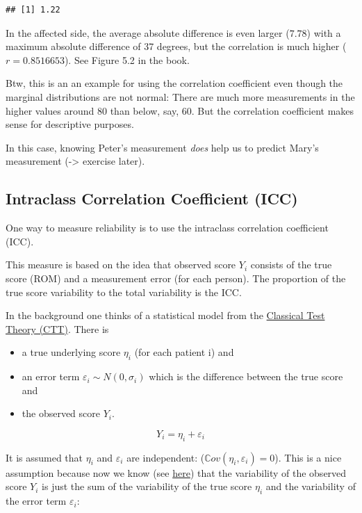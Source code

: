 \documentclass[
]{book}
\providecommand{\tightlist}{%
  \setlength{\itemsep}{0pt}\setlength{\parskip}{0pt}}
\begin{document}
\begin{verbatim}
## [1] 1.22
\end{verbatim}

In the affected side, the average absolute difference is even larger (\(7.78\))
with a maximum absolute difference of 37 degrees,
but the correlation is much higher (\(r=0.8516653\)). See Figure 5.2 in the book.

Btw, this is an an example for using the correlation coefficient even though
the marginal distributions are not normal: There are much more measurements in the higher
values around 80 than below, say, 60. But the correlation coefficient makes sense
for descriptive purposes.

In this case, knowing Peter's measurement \emph{does} help us to predict
Mary's measurement (-\textgreater{} exercise later).

\subsection{Intraclass Correlation Coefficient (ICC)}\label{intraclass-correlation-coefficient-icc}

One way to measure reliability is to use the intraclass correlation coefficient (ICC).

This measure is based on the idea that observed score \(Y_i\) consists of the true score
(ROM) and a measurement error (for each person).
The proportion of the true score variability to the total variability is the ICC.

In the background one thinks of a statistical model from the
\href{https://en.wikipedia.org/wiki/Classical_test_theory}{Classical Test Theory (CTT)}.
There is

\begin{itemize}
\tightlist
\item
  a true underlying score \(\eta_i\) (for each patient i) and
\item
  an error term \(\varepsilon_i \sim N(0, \sigma_i)\) which is the difference between the true
  score and
\item
  the observed score \(Y_i\).
\end{itemize}

\[ Y_i = \eta_i + \varepsilon_i \]

It is assumed that \(\eta_i\) and \(\varepsilon_i\) are independent: (\(\mathbb{C}ov(\eta_i, \varepsilon_i)=0\)).
This is a nice assumption because now we know (see \href{https://en.wikipedia.org/wiki/Variance\#Addition_and_multiplication_by_a_constant}{here})
that the variability
of the observed score \(Y_i\) is just the sum of the variability of the true score \(\eta_i\)
and the variability of the error term \(\varepsilon_i\):
\end{document}
